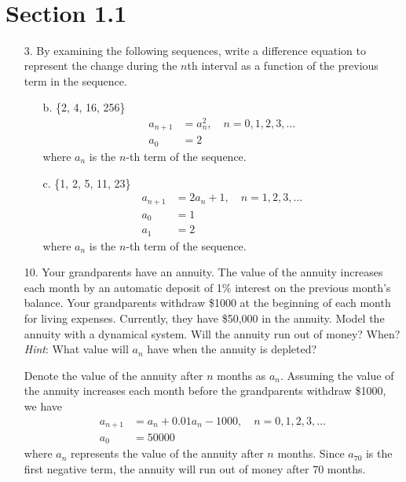 \documentclass[10pt]{report}
\title{
	\courseTitle\\
	\hwNo\\
	\hwDate
}
\author{\hwAuther}
\date{}
\begin{document}
\maketitle

\section*{Section 1.1}
\begin{enumerate}
	\item[3.]
	By examining the following sequences, write a difference equation to represent the change during the $n$th interval as a function of the previous term in the sequence.
	
	\begin{enumerate}
		\item [b.]
		\{2, 4, 16, 256\}
		\begin{align*}
			a_{n+1} &= a_n^2, \quad n=0,1,2,3,\dots\\
			a_0 &= 2
		\end{align*}
		where $a_n$ is the $n$-th term of the sequence.
		
		\item [c.]
		\{1, 2, 5, 11, 23\}
		\begin{align*}
			a_{n+1} &= 2 a_n + 1, \quad n=1,2,3,\dots\\
			a_0 &= 1\\
			a_1 &= 2
		\end{align*}
		where $a_n$ is the $n$-th term of the sequence.
	\end{enumerate}

	\item [10.]
	Your grandparents have an annuity. The value of the annuity increases each month by an automatic deposit of 1\% interest on the previous month's balance. Your grandparents withdraw \$1000 at the beginning of each month for living expenses. Currently, they have \$50,000 in the annuity. Model the annuity with a dynamical system. Will the annuity run out of money? When? \textit{Hint}: What value will $a_n$ have when the annuity is depleted?
	
	Denote the value of the annuity after $n$ months as $a_n$. Assuming the value of the annuity increases each month before the grandparents withdraw \$1000, we have
	\begin{align*}
		a_{n+1} &= a_n + 0.01 a_n - 1000, \quad n=0,1,2,3,\dots\\
		a_0 &= 50000
	\end{align*}
	where $a_n$ represents the value of the annuity after $n$ months. Since $a_{70}$ is the first negative term, the annuity will run out of money after 70 months.
	

\end{enumerate}
\end{document}
